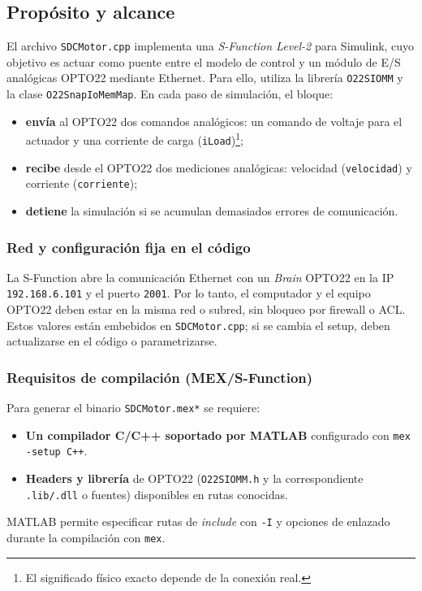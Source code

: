 \subsection{Propósito y alcance}
El archivo \texttt{SDCMotor.cpp} implementa una \emph{S-Function Level-2} para Simulink, cuyo objetivo es actuar como puente entre el modelo de control y un módulo de E/S analógicas OPTO22 mediante Ethernet. Para ello, utiliza la librería \texttt{O22SIOMM} y la clase \texttt{O22SnapIoMemMap}. En cada paso de simulación, el bloque:
\begin{itemize}
    \item \textbf{envía} al OPTO22 dos comandos analógicos: un comando de voltaje para el actuador y una corriente de carga (\texttt{iLoad})\footnote{El significado físico exacto depende de la conexión real.};
    \item \textbf{recibe} desde el OPTO22 dos mediciones analógicas: velocidad (\texttt{velocidad}) y corriente (\texttt{corriente});
    \item \textbf{detiene} la simulación si se acumulan demasiados errores de comunicación.
\end{itemize}



\subsubsection{Red y configuración fija en el código}
La S-Function abre la comunicación Ethernet con un \emph{Brain} OPTO22 en la IP \texttt{192.168.6.101} y el puerto \texttt{2001}. Por lo tanto, el computador y el equipo OPTO22 deben estar en la misma red o subred, sin bloqueo por firewall o ACL. Estos valores están embebidos en \texttt{SDCMotor.cpp}; si se cambia el setup, deben actualizarse en el código o parametrizarse.

\subsubsection{Requisitos de compilación (MEX/S-Function)}
Para generar el binario \texttt{SDCMotor.mex*} se requiere:
\begin{itemize}
    \item \textbf{Un compilador C/C++ soportado por MATLAB} configurado con \texttt{mex -setup C++}.
    \item \textbf{Headers y librería} de OPTO22 (\texttt{O22SIOMM.h} y la correspondiente \texttt{.lib/.dll} o fuentes) disponibles en rutas conocidas.
\end{itemize}
MATLAB permite especificar rutas de \emph{include} con \texttt{-I} y opciones de enlazado durante la compilación con \texttt{mex}.

